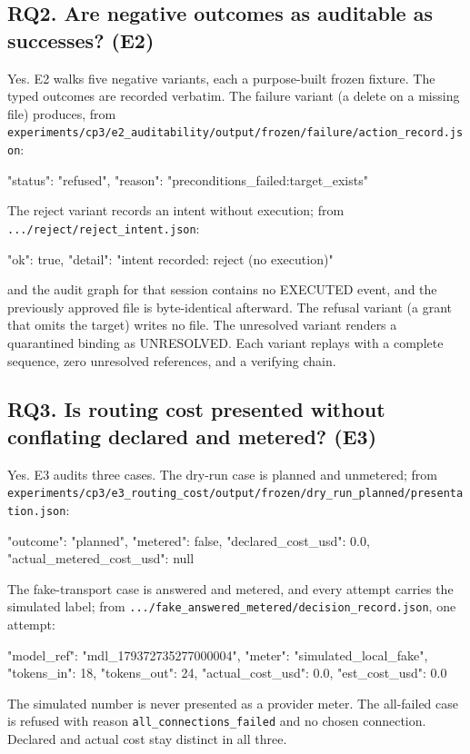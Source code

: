 \documentclass[11pt,a4paper]{article}
\begin{document}
\subsection*{RQ2. Are negative outcomes as auditable as successes? (E2)}
Yes. E2 walks five negative variants, each a purpose-built frozen fixture. The typed outcomes are recorded verbatim. The failure variant (a delete on a missing file) produces, from \texttt{experiments/cp3/e2\_auditability/output/frozen/failure/action\_record.json}:

\begin{codeblock}
{"status": "refused", "reason": "preconditions_failed:target_exists"}
\end{codeblock}
The reject variant records an intent without execution; from \texttt{.../reject/reject\_intent.json}:

\begin{codeblock}
{"ok": true, "detail": "intent recorded: reject (no execution)"}
\end{codeblock}
and the audit graph for that session contains no EXECUTED event, and the previously approved file is byte-identical afterward. The refusal variant (a grant that omits the target) writes no file. The unresolved variant renders a quarantined binding as UNRESOLVED. Each variant replays with a complete sequence, zero unresolved references, and a verifying chain.

\subsection*{RQ3. Is routing cost presented without conflating declared and metered? (E3)}
Yes. E3 audits three cases. The dry-run case is planned and unmetered; from \texttt{experiments/cp3/e3\_routing\_cost/output/frozen/dry\_run\_planned/presentation.json}:

\begin{codeblock}
{"outcome": "planned", "metered": false, "declared_cost_usd": 0.0,
 "actual_metered_cost_usd": null}
\end{codeblock}
The fake-transport case is answered and metered, and every attempt carries the simulated label; from \texttt{.../fake\_answered\_metered/decision\_record.json}, one attempt:

\begin{codeblock}
{"model_ref": "mdl_179372735277000004", "meter": "simulated_local_fake",
 "tokens_in": 18, "tokens_out": 24, "actual_cost_usd": 0.0, "est_cost_usd": 0.0}
\end{codeblock}
The simulated number is never presented as a provider meter. The all-failed case is refused with reason \texttt{all\_connections\_failed} and no chosen connection. Declared and actual cost stay distinct in all three.
\end{document}
